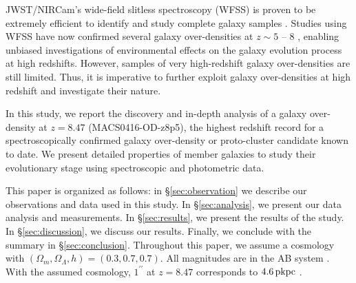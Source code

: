 \documentclass[twocolumn]{aastex631}
\def\arc{^{\prime\prime}}
\begin{document}
 

JWST/NIRCam's wide-field slitless spectroscopy (WFSS) is proven to be extremely efficient to identify and study complete galaxy samples \citep[e.g.,][]{Oesch2023,Sun2023}.
Studies using WFSS have now confirmed several galaxy over-densities at $z\sim5$ -- $8$ \citep[e.g.,][]{Champagne2024a,Helton2024,Helton2024b,Ma2024,Sun2024,Eilers2024,Herard-Demanche2025}, enabling unbiased investigations of environmental effects on the galaxy evolution process at high redshifts.
However, samples of very high-redshift galaxy over-densities are still limited. Thus, it is imperative to further exploit galaxy over-densities at high redshift and investigate their nature.

In this study, we report the discovery and in-depth analysis of a galaxy over-density at $z=8.47$ (MACS0416-OD-z8p5), the highest redshift record for a spectroscopically confirmed galaxy over-density or proto-cluster candidate known to date.
We present detailed properties of member galaxies to study their evolutionary stage using spectroscopic and photometric data.

This paper is organized as follows: in \S\ref{sec:observation} we describe our observations and data used in this study. In \S\ref{sec:analysis}, we present our data analysis and measurements.  In \S\ref{sec:results}, we present the results of the study. In \S\ref{sec:discussion}, we discuss our results. Finally, we conclude with the summary in \S\ref{sec:conclusion}.
Throughout this paper, we assume a cosmology with $(\Omega_m,\Omega_{\Lambda},h)=(0.3,0.7,0.7)$.
All magnitudes are in the AB system \citep{1983ApJ...266..713O}.
With the assumed cosmology, $1\arc$ at $z=8.47$ corresponds to $4.6\,{\rm pkpc}$ .
\end{document}
